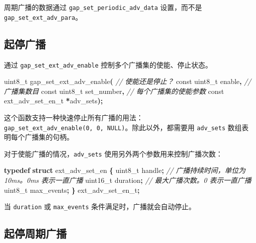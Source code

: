 \documentclass[
  12pt,
]{book}
\newenvironment{Shaded}{\begin{snugshade}}{\end{snugshade}}
\newcommand{\CommentTok}[1]{\textcolor[rgb]{0.56,0.35,0.01}{\textit{#1}}}
\newcommand{\DataTypeTok}[1]{\textcolor[rgb]{0.13,0.29,0.53}{#1}}
\newcommand{\KeywordTok}[1]{\textcolor[rgb]{0.13,0.29,0.53}{\textbf{#1}}}
\newcommand{\NormalTok}[1]{#1}
\newcommand{\OperatorTok}[1]{\textcolor[rgb]{0.81,0.36,0.00}{\textbf{#1}}}
\begin{document}
周期广播的数据通过 \texttt{gap\_set\_periodic\_adv\_data} 设置，而不是 \texttt{gap\_set\_ext\_adv\_para}。

\hypertarget{ux8d77ux505cux5e7fux64ad}{%
\subsection{起停广播}\label{ux8d77ux505cux5e7fux64ad}}

通过 \texttt{gap\_set\_ext\_adv\_enable} 控制多个广播集的使能、停止状态。

\begin{Shaded}
\begin{Highlighting}[]
\DataTypeTok{uint8\_t}\NormalTok{ gap\_set\_ext\_adv\_enable}\OperatorTok{(}
  \CommentTok{// 使能还是停止？}
  \DataTypeTok{const} \DataTypeTok{uint8\_t}\NormalTok{ enable}\OperatorTok{,}
  \CommentTok{// 广播集数目}
  \DataTypeTok{const} \DataTypeTok{uint8\_t}\NormalTok{ set\_number}\OperatorTok{,}
  \CommentTok{// 每个广播集的使能参数}
  \DataTypeTok{const}\NormalTok{ ext\_adv\_set\_en\_t }\OperatorTok{*}\NormalTok{adv\_sets}\OperatorTok{);}
\end{Highlighting}
\end{Shaded}

这个函数支持一种快速停止所有广播的用法：\texttt{gap\_set\_ext\_adv\_enable(0,\ 0,\ NULL)}。除此以外，都需要用 \texttt{adv\_sets}
数组表明每个广播集的句柄。

对于使能广播的情况，\texttt{adv\_sets} 使用另外两个参数用来控制广播次数：

\begin{Shaded}
\begin{Highlighting}[]
\KeywordTok{typedef} \KeywordTok{struct}\NormalTok{ ext\_adv\_set\_en}
\OperatorTok{\{}
    \DataTypeTok{uint8\_t}\NormalTok{ handle}\OperatorTok{;}
    \CommentTok{// 广播持续时间，单位为 10ms。0ms 表示一直广播}
    \DataTypeTok{uint16\_t}\NormalTok{ duration}\OperatorTok{;}
    \CommentTok{// 最大广播次数。0 表示一直广播}
    \DataTypeTok{uint8\_t}\NormalTok{ max\_events}\OperatorTok{;}
\OperatorTok{\}}\NormalTok{ ext\_adv\_set\_en\_t}\OperatorTok{;}
\end{Highlighting}
\end{Shaded}

当 \texttt{duration} 或 \texttt{max\_events} 条件满足时，广播就会自动停止。

\hypertarget{ux8d77ux505cux5468ux671fux5e7fux64ad}{%
\subsection{起停周期广播}\label{ux8d77ux505cux5468ux671fux5e7fux64ad}}
\end{document}
